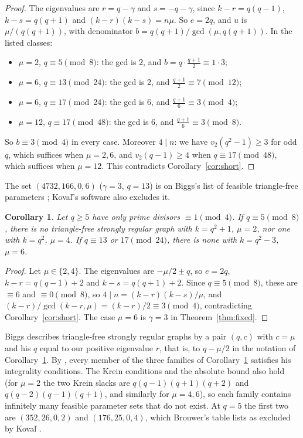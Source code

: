 \documentclass[11pt]{article}
\newtheorem{corollary}[theorem]{Corollary}
\theoremstyle{definition}
\theoremstyle{remark}
\begin{document}
\begin{proof}
The eigenvalues are $r=q-\gamma$ and $s=-q-\gamma$, since $k-r=q(q-1)$,
$k-s=q(q+1)$ and $(k-r)(k-s)=n\mu$. So $e=2q$, and $u$ is
$\mu/(q(q+1))$, with denominator $b=q(q+1)/\gcd(\mu,q(q+1))$. In
the listed classes:
\begin{itemize}
\item $\mu=2$, $q\equiv5\pmod 8$: the gcd is $2$, and $b=q\cdot\frac{q+1}2\equiv1\cdot3$;
\item $\mu=6$, $q\equiv13\pmod{24}$: the gcd is $2$, and $\frac{q+1}2\equiv7\pmod{12}$;
\item $\mu=6$, $q\equiv17\pmod{24}$: the gcd is $6$, and $\frac{q+1}6\equiv3\pmod4$;
\item $\mu=12$, $q\equiv17\pmod{48}$: the gcd is $6$, and $\frac{q+1}6\equiv3\pmod 8$.
\end{itemize}
So $b\equiv3\pmod 4$ in every case. Moreover $4\mid n$: we have
$v_2(q^2-1)\ge3$ for odd $q$, which suffices when $\mu=2,6$, and
$v_2(q-1)\ge4$ when $q\equiv17\pmod{48}$, which suffices when $\mu=12$. This
contradicts Corollary~\ref{cor:short}.
\end{proof}

The set $(4732,166,0,6)$ ($\gamma=3$, $q=13$) is on Biggs's list of feasible
triangle-free parameters \cite[Table~2]{Biggs}; Kova\v l's software
\cite{Koval} also excludes it.

\begin{corollary}\label{cor:biggs}
Let $q\ge5$ have only prime divisors $\equiv1\pmod4$. If $q\equiv5\pmod 8$,
there is no triangle-free strongly regular graph with $k=q^2+1$, $\mu=2$, nor
one with $k=q^2$, $\mu=4$. If $q\equiv13$ or $17\pmod{24}$, there is none
with $k=q^2-3$, $\mu=6$.
\end{corollary}

\begin{proof}
Let $\mu\in\{2,4\}$. The eigenvalues are $-\mu/2\pm q$, so $e=2q$,
$k-r=q(q-1)+2$ and $k-s=q(q+1)+2$. Since $q\equiv5\pmod 8$, these are
$\equiv6$ and $\equiv0\pmod 8$, so $4\mid n=(k-r)(k-s)/\mu$, and
$(k-r)/\gcd(k-r,\mu)=(k-r)/2\equiv3\pmod 4$, contradicting
Corollary~\ref{cor:short}. The case $\mu=6$ is $\gamma=3$ in
Theorem~\ref{thm:fixed}.
\end{proof}

Biggs \cite{Biggs2} describes triangle-free strongly regular graphs by a pair
$(q,c)$ with $c=\mu$ and his $q$ equal to our positive eigenvalue $r$, that is,
to $q-\mu/2$ in the notation of Corollary~\ref{cor:biggs}. By
\cite[Thm.~3]{Biggs2}, every member of the three families of
Corollary~\ref{cor:biggs} satisfies his integrality conditions. The Krein
conditions and the absolute bound also hold (for $\mu=2$ the two Krein slacks
are $q(q-1)(q+1)(q+2)$ and $q(q-2)(q-1)(q+1)$, and similarly for $\mu=4,6$),
so each family contains infinitely many feasible parameter sets that do not
exist. At $q=5$ the first two are $(352,26,0,2)$ and $(176,25,0,4)$, which
Brouwer's table lists as excluded by Kova\v l \cite{Koval,Tab}.
\end{document}
